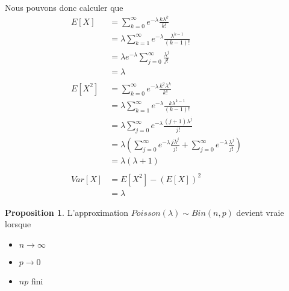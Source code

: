\documentclass[a4paper,12pt]{report}
\theoremstyle{definition}
\newcommand{\ra}{\rightarrow}
\renewcommand{\(}{\left(}
\renewcommand{\)}{\right)}
\newtheorem{prop}[thm]{Proposition}
\begin{document}
\begin{itemize}[label = \textbullet]
                Nous pouvons donc calculer que
                \begin{align*}
                    E[X] &= \sum_{k = 0}^{\infty}e^{-\lambda}\frac{k\lambda^k}{k!} \\
                    &= \lambda \sum_{k = 1}^{\infty}e^{-\lambda}\frac{\lambda^{k-1}}{(k-1)!}\\
                    &= \lambda e^{-\lambda} \sum_{j = 0}^{\infty}\frac{\lambda^{j}}{j!}\\
                    &= \lambda\\
                    &\\
                    E[X^2] &= \sum_{k = 0}^{\infty}e^{-\lambda}\frac{k^2\lambda^k}{k!}\\
                    &= \lambda \sum_{k = 1}^{\infty}e^{-\lambda}\frac{k\lambda^{k-1}}{(k-1)!}\\
                    &= \lambda \sum_{j = 0}^{\infty}e^{-\lambda}\frac{(j+1)\lambda^{j}}{j!}\\
                    &= \lambda\left( \sum_{j = 0}^{\infty}e^{-\lambda}\frac{j\lambda^{j}}{j!} + \sum_{j = 0}^{\infty}e^{-\lambda}\frac{\lambda^{j}}{j!} \right)\\
                    &= \lambda(\lambda + 1)\\
                    &\\
                    Var[X] &= E[X^2] - (E[X])^2\\ 
                    &= \lambda
                \end{align*}
            \end{itemize}
            
            \begin{leftbar}
            \begin{prop}
                L'approximation $Poisson(\lambda) \sim Bin(n,p)$ devient vraie lorsque
                \begin{itemize}[label = \textbullet]
                    \item $n\ra\infty$
                    \item $p\ra 0$
                    \item $np$ fini
                \end{itemize}
            \end{prop}
            \end{leftbar}
            
\end{document}
